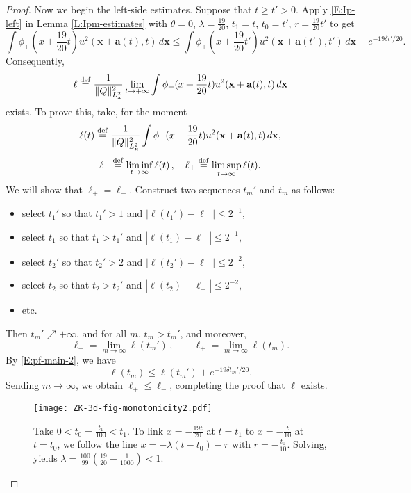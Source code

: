 \documentclass[12pt,letterpaper]{amsart}
\newcommand{\defeq}{\stackrel{\rm{def}}{=}}
\theoremstyle{remark}
\numberwithin{equation}{section}
\numberwithin{theorem}{section}
\numberwithin{table}{section}
\begin{document}
\begin{proof}
Now we begin the left-side estimates.  Suppose that $t\geq t'>0$.  Apply \eqref{E:Ip-left} in Lemma \ref{L:Ipm-estimates} with $\theta=0$, $\lambda = \frac{19}{20}$, $t_1=t$, $t_0=t'$, $r=\frac{19}{20}t'$ to get
\begin{equation}
\label{E:pf-main-2}
\int \phi_+(x +\frac{19}{20}t) u^2(\mathbf{x}+\mathbf{a}(t),t) \,d \mathbf{x} \leq \int \phi_+(x+\frac{19}{20}t') u^2(\mathbf{x}+\mathbf{a}(t'),t') \, d\mathbf{x} + e^{-19\delta t'/20}.
\end{equation}
Consequently, 
\begin{equation}
\label{E:pf-main-4}
\ell \defeq \frac{1}{\|Q\|_{L_{\mathbf{x}}^2}^2} \lim_{t\to +\infty} \int \phi_+(x +\frac{19}{20}t) u^2(\mathbf{x}+\mathbf{a}(t),t) \,d \mathbf{x}
\end{equation}
exists.  To prove this, take, for the moment
$$
\ell(t) \defeq \frac{1}{\|Q\|_{L_{\mathbf{x}}^2}^2} \int \phi_+(x +\frac{19}{20}t) u^2(\mathbf{x}+\mathbf{a}(t),t) \,d \mathbf{x},
$$
$$ 
\ell_- \defeq \liminf_{t\to \infty} \ell(t)\,, \quad \ell_+\defeq\limsup_{t\to \infty} \ell(t).
$$ 
We will show that $\ell_+=\ell_-$.  Construct two sequences $t_m'$ and $t_m$ as follows:
\begin{itemize}
\item 
select $t_1'$ so that $t_1'>1$ and $|\ell(t_1') - \ell_-| \leq 2^{-1}$,
\item 
select $t_1$ so that $t_1>t_1'$ and $|\ell(t_1) - \ell_+| \leq 2^{-1}$,
\item 
select $t_2'$ so that $t_2'>2$ and $|\ell(t_2') - \ell_-| \leq 2^{-2}$,
\item 
select $t_2$ so that $t_2>t_2'$ and $|\ell(t_2) - \ell_+| \leq 2^{-2}$,
\item 
etc.
\end{itemize}
Then $t_m' \nearrow +\infty$, and for all $m$, $t_m>t_m'$, and moreover,
$$
\ell_- = \lim_{m\to \infty} \ell(t_m') \,, \qquad \ell_+ = \lim_{m\to \infty} \ell(t_m).
$$
By \eqref{E:pf-main-2}, we have
$$
\ell(t_m) \leq \ell(t_m') + e^{-19\delta t_m'/20}.
$$
Sending $m\to \infty$, we obtain $\ell_+ \leq \ell_-$, completing the proof that $\ell$ exists.  
\begin{figure}[ht]
\texttt{[image: ZK-3d-fig-monotonicity2.pdf]}
\caption{\label{F:mon-2}Take $0<t_0 = \frac{t_1}{100} < t_1$.  To link $x=-\frac{19 t}{20}$ at $t=t_1$ to $x=-\frac{t}{10}$ at $t=t_0$, we follow the line $x=-\lambda(t-t_0)-r$ with $r=-\frac{t_0}{10}$.  Solving, yields $\lambda = \frac{100}{99}(\frac{19}{20}-\frac{1}{1000})<1$.  }
\end{figure}


\end{proof}
\end{document}
